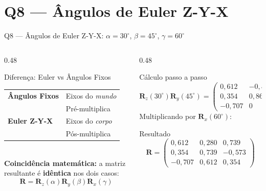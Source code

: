 \documentclass[aspectratio=169,12pt]{beamer}
\newcommand{\Rx}[1]{\mathbf{R}_x(#1)}
\newcommand{\Ry}[1]{\mathbf{R}_y(#1)}
\newcommand{\Rz}[1]{\mathbf{R}_z(#1)}
\newcommand{\degr}{^{\circ}}
\newcommand{\mat}[1]{\begin{pmatrix}#1\end{pmatrix}}
\begin{document}
\section{Q8 --- Ângulos de Euler Z-Y-X}

\begin{frame}{Q8 --- Ângulos de Euler Z-Y-X: $\alpha=30\degr$, $\beta=45\degr$, $\gamma=60\degr$}
  \begin{columns}
    \begin{column}{0.48\textwidth}
      \begin{block}{Diferença: Euler vs Ângulos Fixos}
        \begin{tabular}{ll}
          \textbf{Ângulos Fixos} & Eixos do \emph{mundo}\\
                                 & Pré-multiplica\\[4pt]
          \textbf{Euler Z-Y-X}   & Eixos do \emph{corpo}\\
                                 & Pós-multiplica\\
        \end{tabular}\\[6pt]
        \textbf{Coincidência matemática:} a matriz resultante é \textbf{idêntica} nos dois casos:
        \[
          \mathbf{R} = \Rz{\alpha}\Ry{\beta}\Rx{\gamma}
        \]
      \end{block}
    \end{column}
    \begin{column}{0.48\textwidth}
      \begin{block}{Cálculo passo a passo}
        \small
        $\Rz{30\degr}\Ry{45\degr}=\mat{0{,}612&-0{,}500&0{,}612\\0{,}354&0{,}866&0{,}354\\-0{,}707&0&0{,}707}$\\[6pt]
        Multiplicando por $\Rx{60\degr}$:
      \end{block}
      \begin{exampleblock}{Resultado}
        \[
          \mathbf{R}=\mat{
            0{,}612 &  0{,}280 &  0{,}739\\
            0{,}354 &  0{,}739 & -0{,}573\\
           -0{,}707 &  0{,}612 &  0{,}354}
        \]
      \end{exampleblock}
    \end{column}
  \end{columns}
\end{frame}
\end{document}
